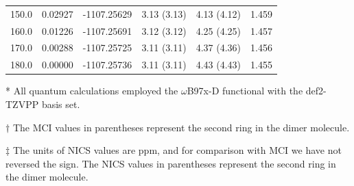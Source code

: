 \begin{table}[hbt!]
\begin{threeparttable}
\begin{tabular}{cccccc}
150.0 & 0.02927 & -1107.25629 & 3.13 (3.13) & 4.13 (4.12) & 1.459 \\
160.0 & 0.01226 & -1107.25691 & 3.12 (3.12) & 4.25 (4.25) & 1.457 \\
170.0 & 0.00288 & -1107.25725 & 3.11 (3.11) & 4.37 (4.36) & 1.456 \\
180.0 & 0.00000 & -1107.25736 & 3.11 (3.11) & 4.43 (4.43) & 1.455 \\ \bottomrule
\end{tabular}
\begin{tablenotes}
\item[*] \footnotesize All quantum calculations employed the $\omega$B97x-D functional with the def2-TZVPP basis set.
\item [$\dagger$] \footnotesize The MCI values in parentheses represent the second ring in the dimer molecule.
\item [$\ddagger$] \footnotesize The units of NICS values are ppm, and for comparison with MCI we have not reversed the sign. The NICS values in parentheses represent the second ring in the dimer molecule.
\end{tablenotes}
\end{threeparttable}
\end{table}

